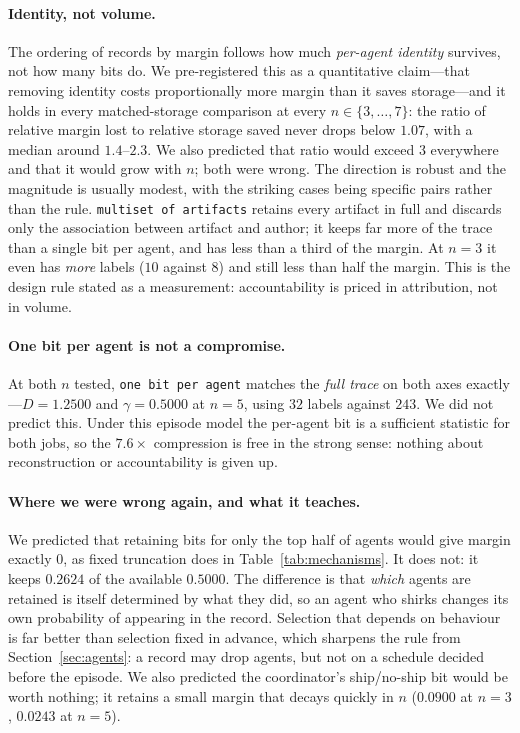 \paragraph{Identity, not volume.}
The ordering of records by margin follows how much \emph{per-agent identity}
survives, not how many bits do. We pre-registered this as a quantitative
claim---that removing identity costs proportionally more margin than it saves
storage---and it holds in every matched-storage comparison at every
$n \in \{3,\dots,7\}$: the ratio of relative margin lost to relative storage
saved never drops below $1.07$, with a median around $1.4$--$2.3$. We also
predicted that ratio would exceed $3$ everywhere and that it would grow with
$n$; both were wrong. The direction is robust and the magnitude is usually
modest, with the striking cases being specific pairs rather than the rule. \texttt{multiset of artifacts} retains every
artifact in full and discards only the association between artifact and author;
it keeps far more of the trace than a single bit per agent, and has less than a
third of the margin. At $n = 3$ it even has \emph{more} labels ($10$ against
$8$) and still less than half the margin. This is the design rule stated as a
measurement: accountability is priced in attribution, not in volume.

\paragraph{One bit per agent is not a compromise.}
At both $n$ tested, \texttt{one bit per agent} matches the \emph{full trace} on
both axes exactly---$D = 1.2500$ and $\gamma = 0.5000$ at $n = 5$, using $32$
labels against $243$. We did not predict this. Under this episode model the
per-agent bit is a sufficient statistic for both jobs, so the $7.6\times$
compression is free in the strong sense: nothing about reconstruction or
accountability is given up.

\paragraph{Where we were wrong again, and what it teaches.}
We predicted that retaining bits for only the top half of agents would give
margin exactly $0$, as fixed truncation does in Table~\ref{tab:mechanisms}. It
does not: it keeps $0.2624$ of the available $0.5000$. The difference is that
\emph{which} agents are retained is itself determined by what they did, so an
agent who shirks changes its own probability of appearing in the record. Selection
that depends on behaviour is far better than selection fixed in advance, which
sharpens the rule from Section~\ref{sec:agents}: a record may drop agents, but not
on a schedule decided before the episode. We also predicted the coordinator's
ship/no-ship bit would be worth nothing; it retains a small margin that decays
quickly in $n$ ($0.0900$ at $n=3$, $0.0243$ at $n=5$).

